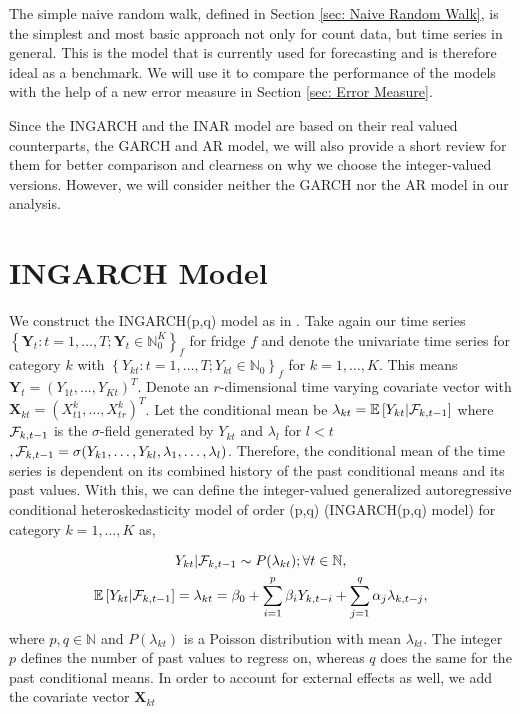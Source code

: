 The simple naive random walk, defined in Section \ref{sec: Naive Random Walk}, is the simplest and most basic approach not only for count data, but time series in general. This is the model that is currently used for forecasting and is therefore ideal as a benchmark. We will use it to compare the performance of the models with the help of a new error measure in Section \ref{sec: Error Measure}. 

Since the INGARCH and the INAR model are based on their real valued counterparts, the GARCH and AR model, we will also provide a short review for them for better comparison and clearness on why we choose the integer-valued versions. However, we will consider neither the GARCH nor the AR model in our analysis. 

\section{INGARCH Model}
\label{sec:Ingarch}

We construct the INGARCH(p,q) model as in \textcite{Liboschik:2016}. 
Take again our time series $\left\{\bm{Y}_t:t=1,\ldots,T; \bm{Y}_t \in \mathbb{N}_0^K \right\}_f$ for fridge $f$ and denote the univariate time series for category $k$ with $\left\{Y_{kt}:t=1,\ldots,T; Y_{kt} \in \mathbb{N}_0\right\}_f$  for $k=1,\ldots,K$. This means $\bm{Y}_t = (Y_{1t},\ldots,Y_{Kt})^T$. Denote an $r$-dimensional time varying covariate vector with $\textbf{X}_{kt}=(X_{t1}^k,\ldots,X_{tr}^k)^T$. Let the conditional mean be $\lambda_{kt} = \mathbb{E}\left[Y_{kt} | \mathcal{F}_{k,t-1} \right]$ where $\mathcal{F}_{k,t-1}$ is the $\sigma$-field generated by $Y_{kt}$ and $\lambda_l$ for $l<t$ $, \mathcal{F} _{k,t-1}= \sigma(Y_{k1},\ldots,Y_{kl},\lambda_1, \ldots, \lambda_l)$. Therefore, the conditional mean of the time series is dependent on its combined history of the past conditional means and its past values. With this, we can define the integer-valued generalized autoregressive conditional heteroskedasticity model of order (p,q) (INGARCH(p,q) model) for category $k=1,\ldots,K$ as,

\begin{equation}
\begin{gathered}
\label{eq:Ingarch model}
Y_{kt} | \mathcal{F}_{k,t-1} \sim P(\lambda_{kt}); \forall t \in \mathbb{N}, \\
\mathbb{E}\left[Y_{kt} | \mathcal{F}_{k,t-1} \right] = \lambda_{kt} = \beta_0 + \sum_{i=1}^p\beta_i Y_{k,t-i} + \sum_{j=1}^q\alpha_j \lambda_{k,t-j},
\end{gathered}
\end{equation}
%
where $p,q \in \mathbb{N}$ and $P(\lambda_{kt})$ is a Poisson distribution with mean $\lambda_{kt}$. The integer $p$ defines the number of past values to regress on, whereas $q$ does the same for the past conditional means. In order to account for external effects as well, we add the covariate vector $\textbf{X}_{kt}$

